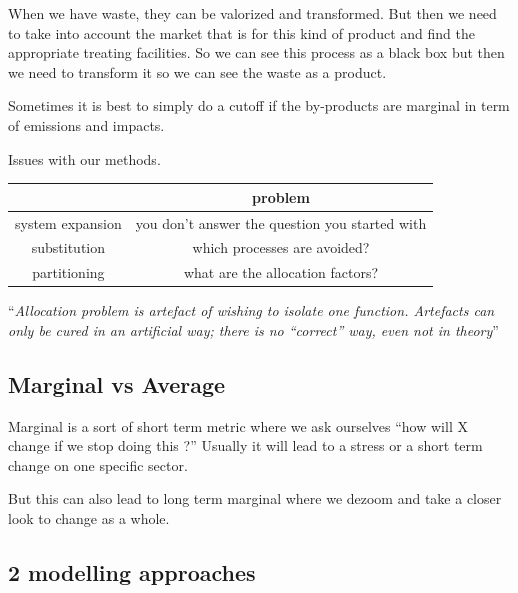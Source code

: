 When we have waste, they can be valorized and transformed. But then we
need to take into account the market that is for this kind of product
and find the appropriate treating facilities. So we can see this process
as a black box but then we need to transform it so we can see the waste
as a product.

Sometimes it is best to simply do a cutoff if the by-products are
marginal in term of emissions and impacts.

Issues with our methods.

\begin{longtable}[]{@{}cc@{}}
\toprule\noalign{}
& problem \\
\midrule\noalign{}
\endhead
\bottomrule\noalign{}
\endlastfoot
system expansion & you don't answer the question you started with \\
substitution & which processes are avoided? \\
partitioning & what are the allocation factors? \\
\end{longtable}

``\emph{Allocation problem is artefact of wishing to isolate one
function. Artefacts can only be cured in an artificial way; there is no
``correct'' way, even not in theory}''

\hypertarget{marginal-vs-average}{%
\subsection{Marginal vs Average}\label{marginal-vs-average}}

Marginal is a sort of short term metric where we ask ourselves ``how
will X change if we stop doing this ?'' Usually it will lead to a stress
or a short term change on one specific sector.

But this can also lead to long term marginal where we dezoom and take a
closer look to change as a whole.

\hypertarget{modelling-approaches}{%
\subsection{2 modelling approaches}\label{modelling-approaches}}

